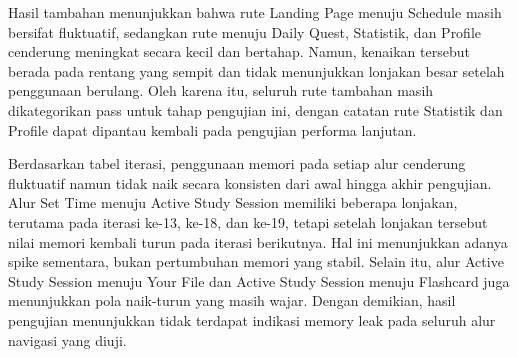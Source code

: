 \documentclass[11pt]{article}
\begin{document}
\begin{center}
\renewcommand{\arraystretch}{1.2}
\end{center}

Hasil tambahan menunjukkan bahwa rute Landing Page menuju Schedule masih bersifat fluktuatif, sedangkan rute menuju Daily Quest, Statistik, dan Profile cenderung meningkat secara kecil dan bertahap. Namun, kenaikan tersebut berada pada rentang yang sempit dan tidak menunjukkan lonjakan besar setelah penggunaan berulang. Oleh karena itu, seluruh rute tambahan masih dikategorikan pass untuk tahap pengujian ini, dengan catatan rute Statistik dan Profile dapat dipantau kembali pada pengujian performa lanjutan.

Berdasarkan tabel iterasi, penggunaan memori pada setiap alur cenderung fluktuatif namun tidak naik secara konsisten dari awal hingga akhir pengujian. Alur Set Time menuju Active Study Session memiliki beberapa lonjakan, terutama pada iterasi ke-13, ke-18, dan ke-19, tetapi setelah lonjakan tersebut nilai memori kembali turun pada iterasi berikutnya. Hal ini menunjukkan adanya spike sementara, bukan pertumbuhan memori yang stabil. Selain itu, alur Active Study Session menuju Your File dan Active Study Session menuju Flashcard juga menunjukkan pola naik-turun yang masih wajar. Dengan demikian, hasil pengujian menunjukkan tidak terdapat indikasi memory leak pada seluruh alur navigasi yang diuji.
\end{document}

